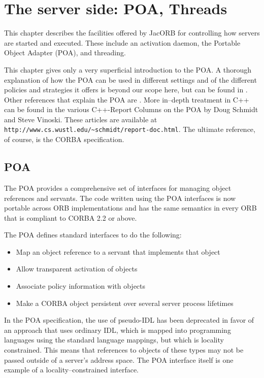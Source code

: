 \documentclass[12pt]{scrbook}
\begin{document}
\chapter{The server side: POA, Threads}
\label{POA}

This  chapter   describes  the   facilities  offered  by   JacORB  for
controlling  how servers are  started and  executed. These  include an
activation daemon, the Portable Object Adapter (POA), and threading.

This chapter gives only a very superficial introduction to the POA.  A
thorough explanation of how the  POA can be used in different settings
and of the  different policies and strategies it  offers is beyond our
scope here,  but can be found in  \cite{Brose2001a}.  Other references
that  explain  the  POA  are  \cite{Henning1999,  Vinoski1998}.   More
in--depth  treatment in  C++ can  be found  in the  various C++-Report
Columns on the POA by  Doug Schmidt and Steve Vinoski.  These articles
are                            available                            at
\verb+http://www.cs.wustl.edu/~schmidt/report-doc.html+.  The ultimate
reference, of course, is the CORBA specification.

\section{POA}

The POA provides a comprehensive set of interfaces for managing object
references and servants. The code  written using the POA interfaces is
now portable across ORB implementations  and has the same semantics in
every ORB that is compliant to CORBA 2.2 or above.

The POA defines standard interfaces to do the following:
\begin{itemize}
\item Map an object reference to a servant that implements that object
\item Allow transparent activation of objects
\item Associate policy information with objects
\item  Make a  CORBA  object persistent  over  several server  process
lifetimes
\end{itemize}

In the POA specification, the use of pseudo-IDL has been deprecated in
favor  of an approach  that uses  ordinary IDL,  which is  mapped into
programming languages using the  standard language mappings, but which
is  locality constrained.  This means  that references  to  objects of
these types may not be passed outside of a server's address space. The
POA  interface  itself  is  one  example of  a  locality--constrained
interface.
\end{document}
